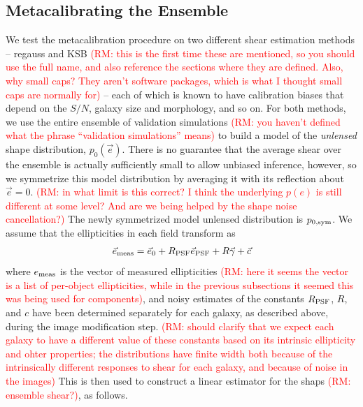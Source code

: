 \documentclass[iop]{emulateapj}
\newcommand\rmcomment[1]{\textcolor{red}{(RM: #1)}}
\begin{document}
\subsection{Metacalibrating the Ensemble}
We test the metacalibration procedure on two different shear
estimation methods -- {\sc regauss} and {\sc KSB} \rmcomment{this is
  the first time these are mentioned, so you should use the full name,
  and also reference the sections where they are defined.  Also, why
  small caps?  They aren't software packages, which is what I thought
  small caps are normally for} -- each of which is known to have
calibration biases that depend on the $S/N$, galaxy size and
morphology, and so on. For both methods, we use the entire ensemble of
validation simulations \rmcomment{you haven't defined what the phrase
  ``validation simulations'' means} to build a model of the {\it
  unlensed} shape distribution, $p_0(\vec{e})$. There is no guarantee
that the average shear over the ensemble is actually sufficiently
small to allow unbiased inference, however, so we symmetrize this
model distribution by averaging it with its reflection about
$\vec{e}=0$. \rmcomment{in what limit is this correct?  I think the
  underlying $p(e)$ is still different at some level?  And are we
  being helped by the shape noise cancellation?}  The newly
symmetrized model unlensed distribution is $p_{0,\rm sym}$. We assume
that the ellipticities in each field transform as
\begin{align}
\vec{e}_{\rm meas} = \vec{e}_{0} + R_{\rm PSF} \vec{e}_{\rm PSF} + R\vec{\gamma} + \vec{c}
\label{eqn:edist_model}
\end{align}
where $e_{\rm meas}$ is the vector of measured ellipticities \rmcomment{here it seems the vector is
  a list of per-object ellipticities, while in the previous subsections it seemed this was being
  used for components}, and noisy estimates of the
constants $R_{\rm PSF}$, $R$, and $c$ have been determined separately
for each galaxy, as described above, during the image modification
step. \rmcomment{should clarify that we expect each galaxy to have a different value of these
  constants based on its intrinsic ellipticity and ohter properties; the distributions have finite
  width both because of the intrinsically different responses to shear for each galaxy, and because
  of noise in the images} This is then used to construct a linear estimator for the
shaps \rmcomment{ensemble shear?}, as follows.
\end{document}
